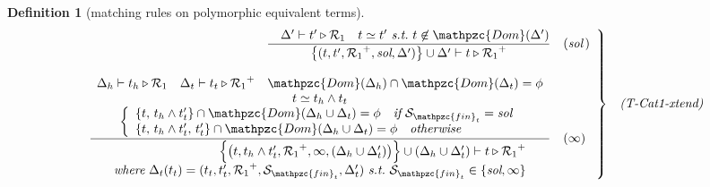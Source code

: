 \documentclass[12pt]{article}
\newtheorem{Definition}{Definition}[section]
\begin{document}
\begin{Definition}[matching rules on polymorphic equivalent terms]
  \begin{displaymath}
    \begin{array}{c}
      
      \begin{array}{rl}
        \left. \begin{array}{rl}
          \dfrac{
            \quad \Delta' \vdash t' \triangleright \mathcal{R}_1 \quad
             t \simeq t'\ \text{\it s.t.}\ t \not\in \mathpzc{Dom}(\Delta')
          }{
            \bigl\{(t, t', {\mathcal{R}_1}^+, \text{\it sol}, \Delta')
             \bigr\} \cup \Delta' \vdash
              t \triangleright {\mathcal{R}_1}^+
          }  &  (\text{\it sol}\,)  \\
          \\
          \dfrac{
            \begin{array}{c}
              \Delta_h \vdash t_h \triangleright \mathcal{R}_1
               \quad \Delta_t \vdash t_t \triangleright {\mathcal{R}_1}^+
                \quad \mathpzc{Dom}(\Delta_h) \cap \mathpzc{Dom}(\Delta_t)
                 = \phi  \\
              t \simeq t_h \wedge t_t  \\
              \left\{\begin{array}{l}
                \{t,\, t_h \wedge t'_t \} \cap \mathpzc{Dom}(
                 \Delta_h \cup \Delta_t) = \phi\quad \text{\it if}\
                  \mathcal{S}_{\mathpzc{fin}_t} = \text{\it sol}  \\
                \{t,\, t_h \wedge t'_t,\, t'_t \} \cap \mathpzc{Dom}(
                 \Delta_h \cup \Delta_t) = \phi\quad \text{\it otherwise}
              \end{array}\right.
            \end{array}
          }{
            \begin{array}{r}
              \Bigl\{\bigl(t, t_h \wedge t_t', {\mathcal{R}_1}^+, \infty,
               (\Delta_h \cup \Delta_t') \bigr) \Bigr\} \cup
                (\Delta_h \cup \Delta_t') \vdash
                 t \triangleright {\mathcal{R}_1}^+  \\
              \text{\it where}\
               \Delta_t(t_t) = (t_t, t_t', {\mathcal{R}_1}^+,
                \mathcal{S}_{\mathpzc{fin}_t}, \Delta_t')\ \text{\it s.t.}\
                 \mathcal{S}_{\mathpzc{fin}_t} \in \{\text{\it sol}, \infty\}
            \end{array}
          }  &  (\infty)
        \end{array} \right\}  &  \text{\it (T-Cat1-xtend)}
      \end{array}  \\
      \\
      

\end{array}
\end{displaymath}
\end{Definition}
\end{document}
